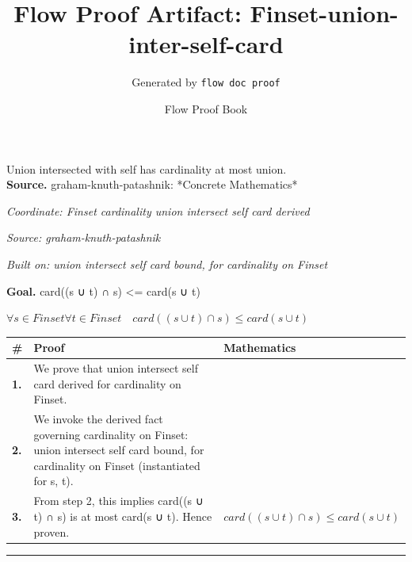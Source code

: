 \documentclass[11pt]{article}
\title{Flow Proof Artifact: Finset-union-inter-self-card}
\author{Generated by \texttt{flow doc proof}}
\date{Flow Proof Book}
\theoremstyle{definition}
\begin{document}
\maketitle
Union intersected with self has cardinality at most union.\\[0.5em]
\textbf{Source.} graham-knuth-patashnik: *Concrete Mathematics*\\[0.5em]
\bigskip
{}\par
\smallskip\noindent\textit{Coordinate: Finset \cdot cardinality \cdot union intersect self card derived}\par
\smallskip\noindent\textit{Source: graham-knuth-patashnik}\par
\smallskip\noindent\textit{Built on: union intersect self card bound, for cardinality on Finset}\par
\medskip
\noindent\textbf{Goal.} card((s ∪ t) ∩ s) <= card(s ∪ t)\par
\noindent$\displaystyle \forall s \in Finset \forall t \in Finset\quad card((s ∪ t) ∩ s) \le card(s ∪ t)$\par
\medskip
\noindent
\begin{tabular}{@{} >{\raggedright\arraybackslash}p{} >{\raggedright\arraybackslash}p{} >{\raggedleft\arraybackslash}p{} @{}}
\textbf{\#} & \textbf{Proof} & \textbf{Mathematics} \\
\midrule
\textbf{1.} & We prove that union intersect self card derived for cardinality on Finset. & \\[0.45em]
\textbf{2.} & We invoke the derived fact governing cardinality on Finset: union intersect self card bound, for cardinality on Finset (instantiated for s, t). & \\[0.45em]
\textbf{3.} & From step 2, this implies card((s ∪ t) ∩ s) is at most card(s ∪ t). Hence proven. & $\displaystyle card((s ∪ t) ∩ s) \le card(s ∪ t)$ \\[0.45em]
\bottomrule
\end{tabular}
\label{thm:Finset-cardinality-union_intersect_self_card_derived}
\par\medskip\hrule
\end{document}
